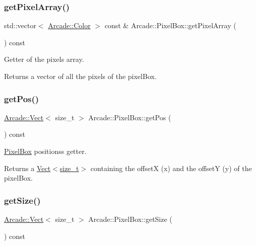 \subsubsection{\texorpdfstring{get\+Pixel\+Array()}{getPixelArray()}}
{\footnotesize\ttfamily std\+::vector$<$ \hyperlink{class_arcade_1_1_color}{Arcade\+::\+Color} $>$ const  \& Arcade\+::\+Pixel\+Box\+::get\+Pixel\+Array (\begin{DoxyParamCaption}{ }\end{DoxyParamCaption}) const}



Getter of the pixels array. 

\begin{DoxyReturn}{Returns}
a vector of all the pixels of the pixel\+Box. 
\end{DoxyReturn}
\mbox{\label{class_arcade_1_1_pixel_box_af041604dd9b7b39a82671b00e445ee0e}} 
\subsubsection{\texorpdfstring{get\+Pos()}{getPos()}}
{\footnotesize\ttfamily \hyperlink{class_arcade_1_1_vect}{Arcade\+::\+Vect}$<$ size\+\_\+t $>$ Arcade\+::\+Pixel\+Box\+::get\+Pos (\begin{DoxyParamCaption}{ }\end{DoxyParamCaption}) const}



\hyperlink{class_arcade_1_1_pixel_box}{Pixel\+Box} positions\textquotesingle{}s getter. 

\begin{DoxyReturn}{Returns}
a \hyperlink{class_arcade_1_1_vect}{Vect$<$size\+\_\+t$>$} containing the offsetX (x) and the offsetY (y) of the pixel\+Box. 
\end{DoxyReturn}
\mbox{\label{class_arcade_1_1_pixel_box_a8f0280a28955151ee0662b206779d06d}} 
\subsubsection{\texorpdfstring{get\+Size()}{getSize()}}
{\footnotesize\ttfamily \hyperlink{class_arcade_1_1_vect}{Arcade\+::\+Vect}$<$ size\+\_\+t $>$ Arcade\+::\+Pixel\+Box\+::get\+Size (\begin{DoxyParamCaption}{ }\end{DoxyParamCaption}) const}



